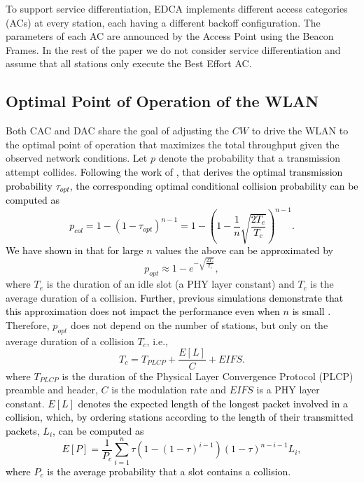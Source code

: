 \documentclass[a4paper,10pt]{article}
\newcommand{\revs}[1]{\textcolor{black}{#1}}
\begin{document}
To support service differentiation, EDCA implements different access categories (ACs) at every station, each having a different backoff configuration. The parameters of each AC are announced  by the Access Point using the Beacon Frames. In the rest of the paper we do not consider service differentiation and assume that all stations only execute the Best Effort AC. 

\subsection{Optimal Point of Operation of the WLAN}
\label{sec:optimal_point}

Both CAC and DAC share the goal of adjusting the $CW$ to drive the WLAN to the optimal point of operation that maximizes the total throughput given the observed network conditions. Let $p$ denote the probability that a transmission attempt collides. \revs{Following the work of \cite{bianchi00}, that derives the optimal transmission probability $\tau_{opt}$, the corresponding optimal conditional collision probability can be computed as
\begin{equation}
p_{col} = 1 - (1-\tau_{opt})^{n-1}= 1 - \left(1-\frac{1}{n} \sqrt{\frac{2 T_e}{T_c}}\right)^{n-1}. 
\end{equation}
We have shown in \cite{patras09monet,patras10tmc} that for large $n$ values the above can be approximated by}
\begin{equation}
p_{opt} \approx 1 - e^{-\sqrt{\frac{2T_e}{T_c}}},
\label{eq:p_opt}
\end{equation}
where $T_e$ is the duration of an idle slot (a PHY layer constant) and $T_c$ is the average duration of a collision. \revs{Further, previous simulations demonstrate that this approximation does not impact the performance even when $n$ is small \cite{patras09monet,patras10tmc}.} Therefore, $p_{opt}$ does not depend on the number of stations, but only on the average duration of a collision $T_c$, i.e., 
$$
T_c = T_{PLCP} + \frac{E[L]}{C} + EIFS.
$$
where $T_{PLCP}$ is the duration of the Physical Layer Convergence Protocol (PLCP) preamble and header, $C$ is the modulation rate and $EIFS$ is a PHY layer constant. \revs{$E[L]$ denotes the expected length of the longest packet involved in a collision, which, by ordering stations according to the length of their transmitted packets, $L_i$, can be computed as
$$
E[P] = \frac{1}{P_c}\sum_{i=1}^n \tau \left(1-(1-\tau)^{i-1}\right)(1-\tau)^{n-i-1}L_i,
$$
where $P_c$ is the average probability that a slot contains a collision.}
\end{document}
